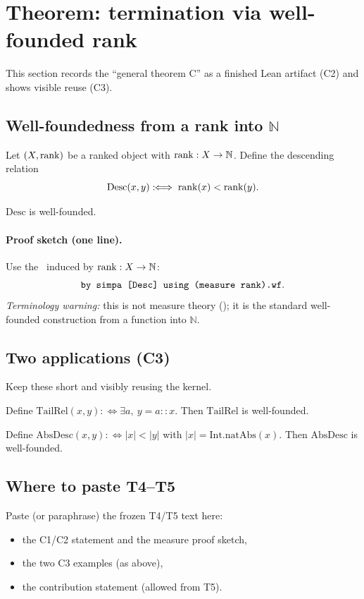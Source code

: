 \section{Theorem: termination via well-founded rank}
\label{sec:termination}

This section records the ``general theorem C'' as a finished Lean artifact (C2) and shows visible reuse (C3).

\subsection{Well-foundedness from a rank into \texorpdfstring{$\mathbb{N}$}{N}}
Let \((X,\mathrm{rank})\) be a ranked object with \(\mathrm{rank} : X\to\mathbb{N}\). Define the descending relation
\[
  \mathrm{Desc}(x,y) :\!\!\iff \mathrm{rank}(x) < \mathrm{rank}(y).
\]

\begin{theorem}
\label{thm:wf-desc}
\(\mathrm{Desc}\) is well-founded.
\end{theorem}

\paragraph{Proof sketch (one line).}
Use the \wfmeasure\ induced by \(\mathrm{rank} : X\to\mathbb{N}\):
\[
  \text{\texttt{by simpa [Desc] using (measure rank).wf}.}
\]
\emph{Terminology warning:} this is not measure theory (); it is the standard
well-founded construction from a function into \(\mathbb{N}\).

\subsection{Two applications (C3)}
Keep these short and visibly reusing the kernel.

\begin{example}
Define \(\mathrm{TailRel}(x,y) :\!\!\iff \exists a,\ y=a::x\). Then \(\mathrm{TailRel}\) is well-founded.
\end{example}

\begin{example}
Define \(\mathrm{AbsDesc}(x,y) :\!\!\iff |x|<|y|\) with \( |x| = \mathrm{Int.natAbs}(x)\).
Then \(\mathrm{AbsDesc}\) is well-founded.
\end{example}

\subsection{Where to paste T4--T5}
Paste (or paraphrase) the frozen T4/T5 text here:
\begin{itemize}
\item the C1/C2 statement and the measure proof sketch,
\item the two C3 examples (as above),
\item the contribution statement (allowed from T5).
\end{itemize}
